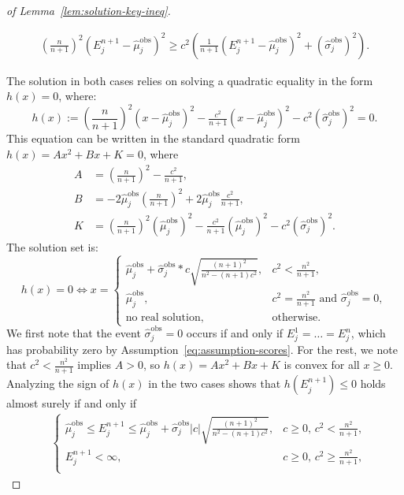 \begin{proof}[of Lemma~\ref{lem:solution-key-ineq}]
\begin{enumerate}
    \begin{align*}
        \left(\frac{n}{n+1}\right)^2\left(E^{n+1}_j-\hat{\mu}^\mathrm{obs}_j\right)^2 \geq c^2\left(\tfrac{1}{n+1}\left(E^{n+1}_j-\hat{\mu}^\mathrm{obs}_j\right)^2 + (\hat{\sigma}^\mathrm{obs}_j)^2\right).
    \end{align*}
  \end{enumerate}
  The solution in both cases relies on solving a quadratic equality in the form $h(x) = 0$, where:
\[
h(x):=\left(\frac{n}{n+1}\right)^2\left(x-\hat{\mu}^\mathrm{obs}_j\right)^2 - \tfrac{c^2}{n+1}\left(x-\hat{\mu}^\mathrm{obs}_j\right)^2 - c^2(\hat{\sigma}^\mathrm{obs}_j)^2 = 0.
\]
This equation can be written in the standard quadratic form
$h(x)= Ax^2+Bx +K = 0$,
where
\begin{align*}
 A & = \left(\frac{n}{n+1}\right)^2 - \frac{c^2}{n+1}, \\
 B & = -2\hat{\mu}^\mathrm{obs}_j\left(\frac{n}{n+1}\right)^2+2\hat{\mu}^\mathrm{obs}_j \frac{c^2}{n+1}, \\
 K & = \left(\frac{n}{n+1}\right)^2(\hat{\mu}^\mathrm{obs}_j)^2-\frac{c^2}{n+1}(\hat{\mu}^\mathrm{obs}_j)^2-c^2(\hat{\sigma}^\mathrm{obs}_j)^2.
\end{align*}
The solution set is:
\[h(x) = 0 \iff x=
\begin{cases}
    \hat{\mu}^\mathrm{obs}_j + \hat{\sigma}^\mathrm{obs}_j*c\sqrt{\tfrac{(n+1)^2}{n^2-(n+1)c^2}}, & c^2 < \tfrac{n^2}{n+1},\\
    \hat{\mu}^\mathrm{obs}_j, & c^2 = \tfrac{n^2}{n+1} \text{ and } \hat{\sigma}^\mathrm{obs}_j = 0,\\
    \text{no real solution}, &\text{otherwise}.
\end{cases}
\]
We first note that the event $\hat{\sigma}^\mathrm{obs}_j = 0$ occurs if and only if $E^1_j=\ldots=E^n_j$, which has probability zero by Assumption~\ref{eq:assumption-scores}. For the rest, we note that $c^2 < \tfrac{n^2}{n+1}$ implies $A>0$, so $h(x) = Ax^2+Bx +K$ is convex for all $x \geq 0$.
Analyzing the sign of $h(x)$ in the two cases shows that $h(E^{n+1}_j) \leq 0$ holds almost surely if and only if
\begin{align*}
    &\begin{cases}
    \hat{\mu}^\mathrm{obs}_j \leq E^{n+1}_j \leq \hat{\mu}^\mathrm{obs}_j+\hat{\sigma}^\mathrm{obs}_j|c|\sqrt{\tfrac{(n+1)^2}{n^2-(n+1)c^2}}, & c \geq 0,\, c^2 < \tfrac{n^2}{n+1}, \\[0.5em]
    E^{n+1}_j < \infty , & c \geq 0,\, c^2 \geq \tfrac{n^2}{n+1}, \\[0.5em]

\end{cases}
\end{align*}
\end{proof}
